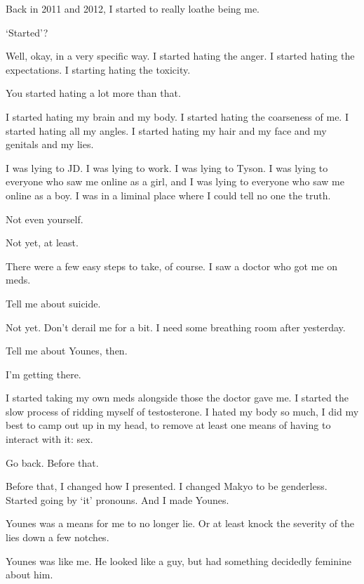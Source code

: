 \noindent Back in 2011 and 2012, I started to really loathe being me.

\begin{ally}
`Started'?
\end{ally}
Well, okay, in a very specific way. I started hating the anger. I started hating the expectations. I starting hating the toxicity.

\begin{ally}
You started hating a lot more than that.
\end{ally}
I started hating my brain and my body. I started hating the coarseness of me. I started hating all my angles. I started hating my hair and my face and my genitals and my lies.

I was lying to JD. I was lying to work. I was lying to Tyson. I was lying to everyone who saw me online as a girl, and I was lying to everyone who saw me online as a boy. I was in a liminal place where I could tell no one the truth.

\begin{ally}
Not even yourself.
\end{ally}
Not yet, at least.

There were a few easy steps to take, of course. I saw a doctor who got me on meds.

\begin{ally}
Tell me about suicide.
\end{ally}
Not yet. Don't derail me for a bit. I need some breathing room after yesterday.

\begin{ally}
Tell me about Younes, then.
\end{ally}
I'm getting there.

I started taking my own meds alongside those the doctor gave me. I started the slow process of ridding myself of testosterone. I hated my body so much, I did my best to camp out up in my head, to remove at least one means of having to interact with it: sex.

\begin{ally}
Go back. Before that.
\end{ally}
Before that, I changed how I presented. I changed Makyo to be genderless. Started going by `it' pronouns. And I made Younes.

Younes was a means for me to no longer lie. Or at least knock the severity of the lies down a few notches.

Younes was like me. He looked like a guy, but had something decidedly feminine about him.

